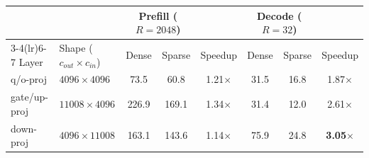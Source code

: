 \begin{tabular}{llcccccc}
\toprule
 & & \multicolumn{2}{c}{Prefill ($R{=}2048$)} & & \multicolumn{2}{c}{Decode ($R{=}32$)} & \\
\cmidrule(lr){3-4}\cmidrule(lr){6-7}
Layer & Shape ($c_{out}{\times}c_{in}$) & Dense & Sparse & Speedup & Dense & Sparse & Speedup \\
\midrule
q/o-proj & $4096\times4096$ & 73.5 & 60.8 & 1.21$\times$ & 31.5 & 16.8 & 1.87$\times$ \\
gate/up-proj & $11008\times4096$ & 226.9 & 169.1 & 1.34$\times$ & 31.4 & 12.0 & 2.61$\times$ \\
down-proj & $4096\times11008$ & 163.1 & 143.6 & 1.14$\times$ & 75.9 & 24.8 & \textbf{3.05$\times$} \\
\bottomrule
\end{tabular}
